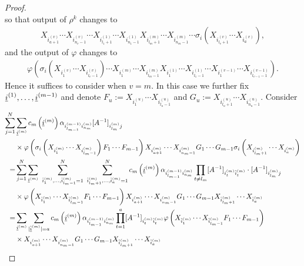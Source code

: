 \begin{proof}
\begin{equation*}
	\end{equation*}
so that output of $\rho^k$ changes to
	\begin{align*}
		X_{i_{a+1}^{(v)}}\cdots X_{i_{n_v-1}^{(v)}} \cdots X_{i_{l_1+1}^{(1)}} \cdots X_{i_{n_1-1}^{(1)}} X_{i_{l_m+1}^{(m)}}\cdots X_{i_{n_m-1}^{(m)}} \cdots \sigma_i\left(X_{i_{l_v+1}^{(v)}}\cdots X_{i_a^{(v)}}\right),
	\end{align*}
and the output of $\varphi$ changes to
	\begin{align*}
		\varphi\left( \sigma_i\left( X_{i_1^{(v)}}\cdots X_{i_{l_v -1}^{(v)}}\right) \cdots X_{i_1^{(m)}}\cdots X_{i_{l_m-1}^{(m)}} X_{i_1^{(1)}}\cdots X_{i_{l_1-1}^{(1)}} \cdots X_{i_1^{(v-1)}}\cdots X_{i_{l_{v-1}-1}^{(v-1)}}\right).
	\end{align*}
Hence it suffices to consider when $v=m$. In this case we further fix $\underline{i}^{(1)},\ldots, \underline{i}^{(m-1)}$ and denote $F_u:=X_{i_1^{(u)}}\cdots X_{i_{l_u-1}^{(u)}}$ and $G_u:=X_{i_{l_u+1}^{(u)}}\cdots X_{i_{n_u-1}^{(u)}}$. Consider
	\begin{align*}
		\sum_{j=1}^N &\sum_{\ul{i}^{(m)}}  c_m\left(\ul{i}^{(m)}\right) \alpha_{i_{l_{m-1}}^{(m-1)} i_{n_m}^{(m)}}[A^{-1}]_{i_{l_m}^{(m)} j}\\
				&\times \varphi\left( \sigma_i\left( X_{i_1^{(m)}}\cdots X_{i_{l_m -1}^{(m)}}\right)  F_1\cdots F_{m-1}\right)   X_{i_{a+1}^{(m)}}\cdots X_{i_{n_m-1}^{(m)}}G_1\cdots G_{m-1} \sigma_i\left(X_{i_{l_m+1}^{(m)}}\cdots X_{i_a^{(m)}}\right)\\
		=&\sum_{j=1}^N \sum_{\ul{i}^{(m)}}\ \sum_{\hat{i}_1^{(m)},\ldots, \hat{i}_{l_m-1}^{(m)}=1}^N\  \sum_{\hat{i}_{l_m+1}^{(m)},\ldots, \hat{i}_a^{(m)}=1}^N c_m\left(\ul{i}^{(m)}\right) \alpha_{i_{l_{m-1}}^{(m-1)} i_{n_m}^{(m)}}\prod_{t\neq l_m}[A^{-1}]_{i_t^{(m)} \hat{i}_t^{(m)}} \cdot [A^{-1} ]_{i_{l_m}^{(m)} j}\\
				&\times \varphi\left( X_{\hat{i}_1^{(m)}}\cdots X_{\hat{i}_{l_m-1}^{(m)}}F_1\cdots F_{m-1}\right)  X_{i_{a+1}^{(m)}}\cdots X_{i_{n_m-1}^{(m)}}G_1\cdots G_{m-1} X_{\hat{i}_{l_m+1}^{(m)}}\cdots X_{\hat{i}_a^{(m)}}\\
		=&\sum_{\ul{i}^{(m)}} \sum_{|\ul{\hat{i}}^{(m)}|=a} c_m\left( \ul{i}^{(m)}\right) \alpha_{i_{l_{m-1}}^{(m-1)} i_{n_m}^{(m)}}\prod_{t=1}^a [A^{-1}]_{i_t^{(m)} \hat{i}_t^{(m)}} \varphi\left( X_{\hat{i}_1^{(m)}}\cdots X_{\hat{i}_{l_m-1}^{(m)}}F_1\cdots F_{m-1}\right) \\
				&\times X_{i_{a+1}^{(m)}}\cdots X_{i_{n_m-1}^{(m)}}G_1\cdots G_{m-1} X_{\hat{i}_{l_m+1}^{(m)}}\cdots X_{\hat{i}_a^{(m)}}\\

\end{align*}
\end{proof}
